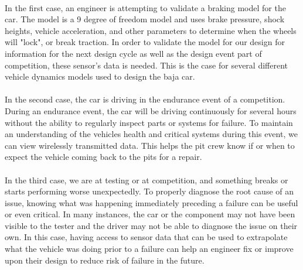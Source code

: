 \paragraph{}
In the first case, an engineer is attempting to validate a braking model for the car.
The model is a 9 degree of freedom model and uses brake pressure, shock heights, vehicle acceleration, and other parameters to determine when the wheels will "lock", or break traction.
In order to validate the model for our design for information for the next design cycle as well as the design event part of competition, these sensor's data is needed.
This is the case for several different vehicle dynamics models used to design the baja car.

\paragraph{}
In the second case, the car is driving in the endurance event of a competition.
During an endurance event, the car will be driving continuously for several hours without the ability to regularly inspect parts or systems for failure.
To maintain an understanding of the vehicles health and critical systems during this event, we can view wirelessly transmitted data.
This helps the pit crew know if or when to expect the vehicle coming back to the pits for a repair.

\paragraph{}
In the third case, we are at testing or at competition, and something breaks or starts performing worse unexpectedly.
To properly diagnose the root cause of an issue, knowing what was happening immediately preceding a failure can be useful or even critical.
In many instances, the car or the component may not have been visible to the tester and the driver may not be able to diagnose the issue on their own.
In this case, having access to sensor data that can be used to extrapolate what the vehicle was doing prior to a failure can help an engineer fix or improve upon their design to reduce risk of failure in the future.